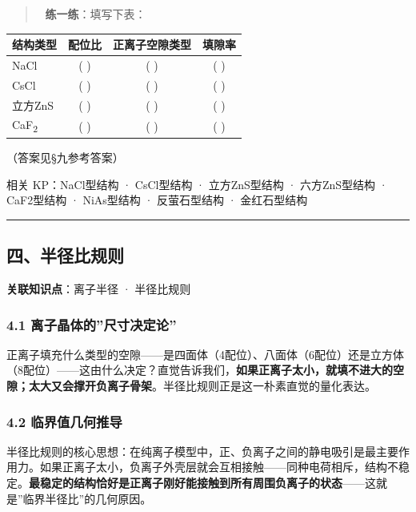 \documentclass[a4paper,11pt]{ctexart}
\newcounter{none}
\begin{document}
\begin{quote}
📝 \textbf{练一练}：填写下表：
\end{quote}

{\def\LTcaptype{none} %
\begin{longtable}[]{@{}lccc@{}}
\toprule\noalign{}
结构类型 & 配位比 & 正离子空隙类型 & 填隙率 \\
\midrule\noalign{}
\endhead
\bottomrule\noalign{}
\endlastfoot
NaCl & ( ) & ( ) & ( ) \\
CsCl & ( ) & ( ) & ( ) \\
立方ZnS & ( ) & ( ) & ( ) \\
CaF\textsubscript{2} & ( ) & ( ) & ( ) \\
\end{longtable}
}

（答案见§九参考答案）

相关 KP：NaCl型结构 · CsCl型结构 · 立方ZnS型结构 · 六方ZnS型结构 · CaF2型结构 · NiAs型结构 · 反萤石型结构 · 金红石型结构

\begin{center}\rule{0.5\linewidth}{0.5pt}\end{center}

\subsection{四、半径比规则}\label{ux56dbux534aux5f84ux6bd4ux89c4ux5219}

\textbf{关联知识点}：离子半径 · 半径比规则

\subsubsection{4.1 离子晶体的''尺寸决定论''}\label{ux79bbux5b50ux6676ux4f53ux7684ux5c3aux5bf8ux51b3ux5b9aux8bba}

正离子填充什么类型的空隙------是四面体（4配位）、八面体（6配位）还是立方体（8配位）------这由什么决定？直觉告诉我们，\textbf{如果正离子太小，就填不进大的空隙；太大又会撑开负离子骨架}。半径比规则正是这一朴素直觉的量化表达。

\subsubsection{4.2 临界值几何推导}\label{ux4e34ux754cux503cux51e0ux4f55ux63a8ux5bfc}

半径比规则的核心思想：在纯离子模型中，正、负离子之间的静电吸引是最主要作用力。如果正离子太小，负离子外壳层就会互相接触------同种电荷相斥，结构不稳定。\textbf{最稳定的结构恰好是正离子刚好能接触到所有周围负离子的状态}------这就是''临界半径比''的几何原因。
\end{document}
